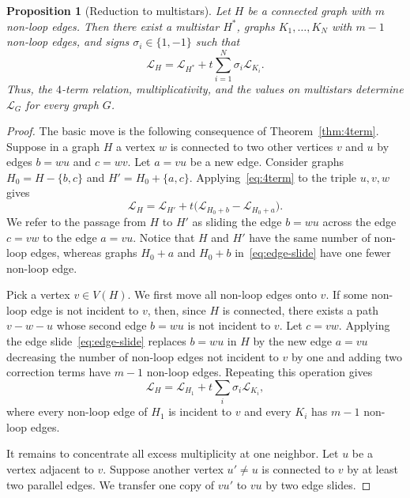 \documentclass[11pt]{article}
\theoremstyle{plain}
\newtheorem{proposition}[theorem]{Proposition}
\theoremstyle{definition}
\renewcommand{\mathcal}{\mathscr}
\newcommand{\LL}{\mathcal{L}}    %
\numberwithin{equation}{section}
\begin{document}
\begin{proposition}[Reduction to multistars]\label{prop:4term-reduction}
  Let $H$ be a connected graph with $m$ non-loop edges.
 Then there exist a multistar $H^\ast$, graphs
$K_1,\ldots,K_N$ with $m-1$ non-loop edges, and signs $\sigma_i\in\{1,-1\}$ such that
\begin{equation}\label{eq:multistar-reduction}
 \LL_H  = \LL_{H^\ast} + t\sum_{i=1}^N\sigma_i\LL_{K_i}.
\end{equation}
Thus, the $4$-term relation, multiplicativity, and the values on multistars determine $\LL_G$ for every graph $G$.
\end{proposition}

\begin{proof}
  The basic move is the following consequence of Theorem~\ref{thm:4term}.
  Suppose in a graph $H$ a vertex $w$ is connected
to two other vertices $v$ and $u$ by edges
$b=wu$ and $c=wv$. Let $a=vu$ be a new edge.
Consider graphs $ H_0=H-\{b,c\}$ and $H'=H_0+\{a,c\}$.
  Applying~\eqref{eq:4term} to the triple $u,v,w$ gives
  \begin{equation}\label{eq:edge-slide}
    \LL_H
    =
    \LL_{H'}
    +
    t\bigl(\LL_{H_0+b}-\LL_{H_0+a}\bigr).
  \end{equation}
  We refer to the passage from $H$ to $H'$ as sliding the edge $b=wu$ across the edge $c=vw$ to the edge $a=vu$.  Notice that $H$ and $H'$ have the
  same number of non-loop edges, whereas graphs $H_0+a$ and $H_0+b$ in~\eqref{eq:edge-slide} have one fewer non-loop edge.
\medskip

Pick a vertex $v\in V(H)$.
We first move all non-loop edges onto $v$.  If some non-loop edge is not
incident to $v$, then, since $H$ is connected, there exists a path $v-w-u$
whose second edge $b=wu$ is not incident to $v$.  Let $c=vw$.  Applying the edge slide~\eqref{eq:edge-slide}
replaces $b=wu$ in $H$ by the new edge $a=vu$
decreasing the number of non-loop edges not incident to $v$ by one and adding two correction terms have $m-1$ non-loop edges.
Repeating this operation gives
\begin{equation}\label{eq:star-reduction}
   \LL_H
   =
   \LL_{H_1}
   +
   t\sum_i\sigma_i\LL_{K_i},
\end{equation}
where every non-loop edge of $H_1$ is incident to $v$ and every $K_i$ has $m-1$ non-loop edges.

It remains to concentrate all excess multiplicity at one neighbor.  Let $u$ be a vertex adjacent to $v$.
Suppose another vertex $u'\ne u$ is connected to $v$ by at least two parallel edges.
We transfer one copy of $vu'$ to $vu$ by two edge slides.


\end{proof}
\end{document}

